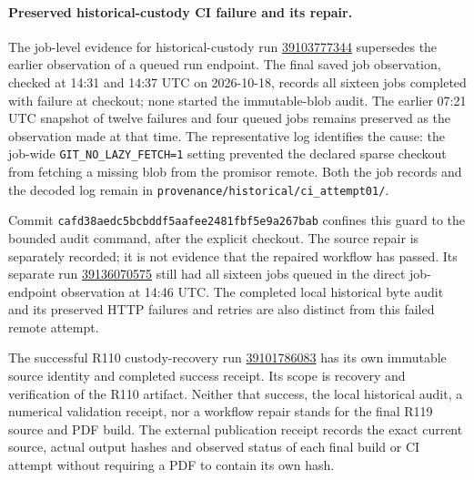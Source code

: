 \paragraph{Preserved historical-custody CI failure and its repair.}
The job-level evidence for historical-custody run
\href{https://github.com/TrillionniumFoundation/NBO/actions/runs/39103777344}{39103777344}
supersedes the earlier observation of a queued run endpoint.  The final saved
job observation, checked at 14:31 and 14:37 UTC on 2026-10-18, records all
sixteen jobs completed with failure at checkout; none started the
immutable-blob audit.  The earlier 07:21 UTC snapshot of twelve failures and
four queued jobs remains preserved as the observation made at that time.
The representative log identifies the cause: the
job-wide \texttt{GIT\_NO\_LAZY\_FETCH=1} setting prevented the declared sparse
checkout from fetching a missing blob from the promisor remote.  Both the job
records and the decoded log remain in
\nolinkurl{provenance/historical/ci_attempt01/}.

Commit \nolinkurl{cafd38aedc5bcbddf5aafee2481fbf5e9a267bab} confines this
guard to the bounded audit command, after the explicit checkout.  The source
repair is separately recorded; it is not evidence that the repaired workflow
has passed.  Its separate run
\href{https://github.com/TrillionniumFoundation/NBO/actions/runs/39136070575}{39136070575}
still had all sixteen jobs queued in the direct job-endpoint observation at
14:46 UTC.  The completed local historical byte audit and its preserved
HTTP failures and retries are also distinct from this failed remote attempt.

The successful R110 custody-recovery run
\href{https://github.com/TrillionniumFoundation/NBO/actions/runs/39101786083}{39101786083}
has its own immutable source identity and completed success receipt.  Its scope
is recovery and verification of the R110 artifact.  Neither that success, the
local historical audit, a numerical validation receipt, nor a workflow repair
stands for the final R119 source and PDF build.  The external publication
receipt records the exact current source, actual output hashes and observed
status of each final build or CI attempt without requiring a PDF to contain
its own hash.
